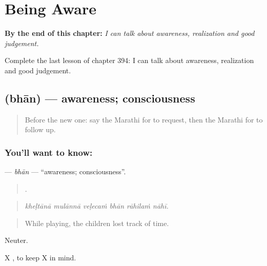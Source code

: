 
\chapter{Being Aware}
\label{ch:mr-being-aware}

\begin{chapteropening}
\textbf{By the end of this chapter:} \emph{I can talk about awareness, realization and good judgement.}

Complete the last lesson of chapter 394: I can talk about awareness, realization and good judgement.
\end{chapteropening}

\section[\texorpdfstring{\mr{भान} (bhān)}{भान (bhān)}]{ (bhān) — awareness; consciousness}

\label{lesson:MR-C394-bhan}



\begin{quote}
Before the new one: say the Marathi for to request, then the Marathi for to follow up.
\end{quote}

\subsection*{You'll want to know: }
\textbf{} — \emph{bhān} — \textquotedblleft{}awareness; consciousness\textquotedblright{}.

\begin{quote}
     .
\end{quote}

\begin{quote}
\emph{kheḷtānā mulānnā veḷecaṁ bhān rāhilaṁ nāhī.}
\end{quote}

\begin{quote}
While playing, the children lost track of time.
\end{quote}

Neuter.

X   , to keep X in mind.

